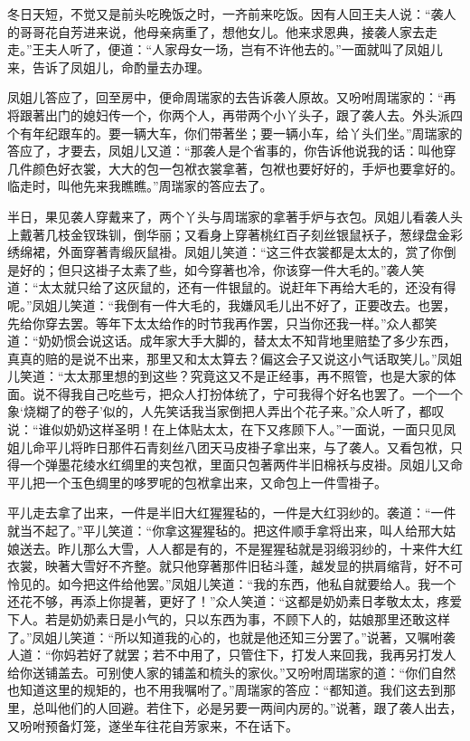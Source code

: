 \begin{parag}
    冬日天短，不觉又是前头吃晚饭之时，一齐前来吃饭。因有人回王夫人说：“袭人的哥哥花自芳进来说，他母亲病重了，想他女儿。他来求恩典，接袭人家去走走。”王夫人听了，便道：“人家母女一场，岂有不许他去的。”一面就叫了凤姐儿来，告诉了凤姐儿，命酌量去办理。
\end{parag}


\begin{parag}
    凤姐儿答应了，回至房中，便命周瑞家的去告诉袭人原故。又吩咐周瑞家的：“再将跟著出门的媳妇传一个，你两个人，再带两个小丫头子，跟了袭人去。外头派四个有年纪跟车的。要一辆大车，你们带著坐；要一辆小车，给丫头们坐。”周瑞家的答应了，才要去，凤姐儿又道：“那袭人是个省事的，你告诉他说我的话：叫他穿几件颜色好衣裳，大大的包一包袱衣裳拿著，包袱也要好好的，手炉也要拿好的。临走时，叫他先来我瞧瞧。”周瑞家的答应去了。
\end{parag}


\begin{parag}
    半日，果见袭人穿戴来了，两个丫头与周瑞家的拿著手炉与衣包。凤姐儿看袭人头上戴著几枝金钗珠钏，倒华丽；又看身上穿著桃红百子刻丝银鼠袄子，葱绿盘金彩绣绵裙，外面穿著青缎灰鼠褂。凤姐儿笑道：“这三件衣裳都是太太的，赏了你倒是好的；但只这褂子太素了些，如今穿著也冷，你该穿一件大毛的。”袭人笑道：“太太就只给了这灰鼠的，还有一件银鼠的。说赶年下再给大毛的，还没有得呢。”凤姐儿笑道：“我倒有一件大毛的，我嫌风毛儿出不好了，正要改去。也罢，先给你穿去罢。等年下太太给作的时节我再作罢，只当你还我一样。”众人都笑道：“奶奶惯会说这话。成年家大手大脚的，替太太不知背地里赔垫了多少东西，真真的赔的是说不出来，那里又和太太算去？偏这会子又说这小气话取笑儿。”凤姐儿笑道：“太太那里想的到这些？究竟这又不是正经事，再不照管，也是大家的体面。说不得我自己吃些亏，把众人打扮体统了，宁可我得个好名也罢了。一个一个象‘烧糊了的卷子’似的，人先笑话我当家倒把人弄出个花子来。”众人听了，都叹说：“谁似奶奶这样圣明！在上体贴太太，在下又疼顾下人。”一面说，一面只见凤姐儿命平儿将昨日那件石青刻丝八团天马皮褂子拿出来，与了袭人。又看包袱，只得一个弹墨花绫水红绸里的夹包袱，里面只包著两件半旧棉袄与皮褂。凤姐儿又命平儿把一个玉色绸里的哆罗呢的包袱拿出来，又命包上一件雪褂子。
\end{parag}


\begin{parag}
    平儿走去拿了出来，一件是半旧大红猩猩毡的，一件是大红羽纱的。袭道：“一件就当不起了。”平儿笑道：“你拿这猩猩毡的。把这件顺手拿将出来，叫人给邢大姑娘送去。昨儿那么大雪，人人都是有的，不是猩猩毡就是羽缎羽纱的，十来件大红衣裳，映著大雪好不齐整。就只他穿著那件旧毡斗蓬，越发显的拱肩缩背，好不可怜见的。如今把这件给他罢。”凤姐儿笑道：“我的东西，他私自就要给人。我一个还花不够，再添上你提著，更好了！”众人笑道：“这都是奶奶素日孝敬太太，疼爱下人。若是奶奶素日是小气的，只以东西为事，不顾下人的，姑娘那里还敢这样了。”凤姐儿笑道：“所以知道我的心的，也就是他还知三分罢了。”说著，又嘱咐袭人道：“你妈若好了就罢；若不中用了，只管住下，打发人来回我，我再另打发人给你送铺盖去。可别使人家的铺盖和梳头的家伙。”又吩咐周瑞家的道：“你们自然也知道这里的规矩的，也不用我嘱咐了。”周瑞家的答应：“都知道。我们这去到那里，总叫他们的人回避。若住下，必是另要一两间内房的。”说著，跟了袭人出去，又吩咐预备灯笼，遂坐车往花自芳家来，不在话下。
\end{parag}


